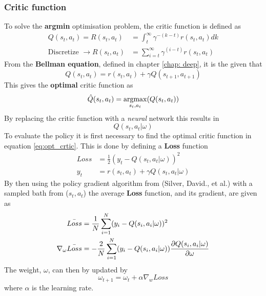 \subsubsection{Critic function}
To solve the \textbf{argmin} optimisation problem, the critic function is defined as
\begin{align}
    Q(s_{t},a_{t}) = R(s_{t}, a_{t}) & = \int_{t}^{\infty} \gamma^{-(k-t)}r(s_{t},a_{t})dk \\
    \text{Discretize } \longrightarrow R(s_{t},a_{t}) & = \sum_{i=t}^{\infty} \gamma^{(i-t)}r(s_{t}, a_{t})
\end{align}
From the \textbf{Bellman equation}, defined in chapter \ref{chap: deep}, it is the given that
\begin{equation}
    Q(s_{t},a_{t}) = r(s_{t},a_{t})+\gamma Q(s_{t+1}, a_{t+1})
\end{equation}
This gives the \textbf{optimal} critic function as
\begin{equation}
    \Hat{Q}(s_{t},a_{t}) = \operatorname*{argmax}_{s_{t},a_{t}}(Q(s_{t},a_{t}))
    \label{eq:opt_crtic}
\end{equation}
By replacing the critic function with a \textit{neural} network this results in
\begin{equation}
    Q(s_{t},a_{t}|\omega)
\end{equation}
To evaluate the policy it is first necessary to find the optimal critic function in equation \ref{eq:opt_crtic}. This is done by defining a \textbf{Loss} function
\begin{align}
    Loss & = \frac{1}{2}(y_{t}-Q(s_{t},a_{t}|\omega))^{2} \\
    y_{t} & = r(s_{t}, a_{t})+\gamma Q(s_{t}, a_{t}|\omega)
\end{align}
By then using the policy gradient algorithm from (Silver, David., et al.) \cite{David} with a sampled bath from ($s_{t}, a_{t}$) the average \textbf{Loss} function, and its gradient, are given as
\begin{align}
   \Bar{Loss} & = \frac{1}{N}\sum_{i=1}^{N}(y_{i}-Q(s_{i},a_{i}|\omega))^{2} \\
   \nabla_{\omega}\Bar{Loss} & = -\frac{2}{N}\sum_{i=1}^{N}(y_{i}-Q(s_{i},a_{i}|\omega))\frac{\partial Q(s_{i},a_{i}|\omega)}{\partial \omega}
\end{align}
The weight, $\omega$, can then by updated by 
\begin{equation}
    \omega_{t+1} = \omega_{t} + \alpha\nabla_{w}Loss
\end{equation}
where $\alpha$ is the learning rate. 
